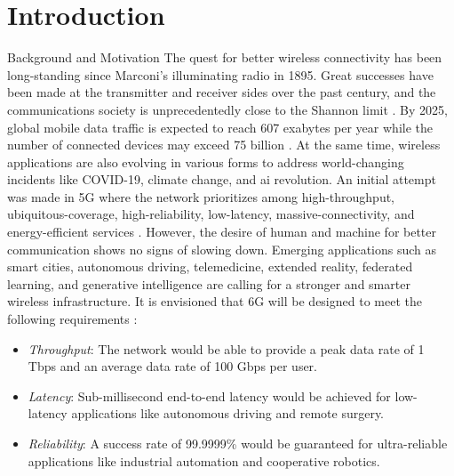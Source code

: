 
\graphicspath{{assets/chapter_1/}}

\chapter{Introduction}\label{ch:introduction}

\begin{section}{Background and Motivation}
	The quest for better wireless connectivity has been long-standing since Marconi's illuminating radio in 1895.
	Great successes have been made at the transmitter and receiver sides over the past century, and the communications society is unprecedentedly close to the Shannon limit \cite{Shannon1948}.
	By 2025, global mobile data traffic is expected to reach {607} exabytes per year \cite{Tariq2020} while the number of connected devices may exceed {75} billion \cite{Georgiev2024}.
	At the same time, wireless applications are also evolving in various forms to address world-changing incidents like COVID-19, climate change, and \gls{ai} revolution.
	An initial attempt was made in 5G where the network prioritizes among high-throughput, ubiquitous-coverage, high-reliability, low-latency, massive-connectivity, and energy-efficient services \cite{Shafi2017}.
	However, the desire of human and machine for better communication shows no signs of slowing down.
	Emerging applications such as smart cities, autonomous driving, telemedicine, extended reality, federated learning, and generative intelligence are calling for a stronger and smarter wireless infrastructure.
	It is envisioned that 6G will be designed to meet the following requirements \cite{Tataria2021,Alsabah2021,Jiang2021}:
	\begin{itemize}
		\item \emph{Throughput}: The network would be able to provide a peak data rate of 1 Tbps and an average data rate of 100 Gbps per user.
		\item \emph{Latency}: Sub-millisecond end-to-end latency would be achieved for low-latency applications like autonomous driving and remote surgery.
		\item \emph{Reliability}: A success rate of 99.9999\% would be guaranteed for ultra-reliable applications like industrial automation and cooperative robotics.

\end{itemize}
\end{section}
